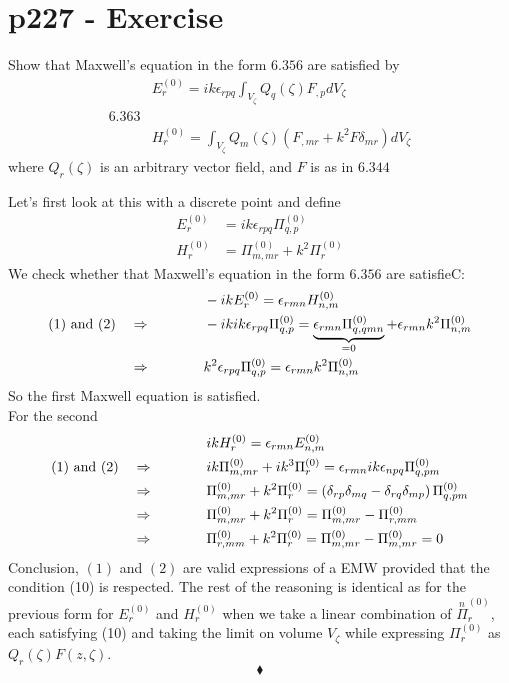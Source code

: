 \section{p227 - Exercise}
\begin{tcolorbox}
Show that Maxwell's equation in the form $\mathbf{6.356}$ are satisfied by 
 $$\begin{array}{ll}& E^{(0)}_r= ik\epsilon_{rpq}\int_{V_{\zeta}}Q_q\left(\zeta\right)F_{,p}dV_{\zeta}\\
 \mathbf{6.363}&\\
 &H^{(0)}_r= \int_{V_{\zeta}}Q_m\left(\zeta\right)\left(F_{,mr}+k^2F\delta_{mr}\right) dV_{\zeta}
 \end{array}$$
 where $Q_r\left(\zeta\right)$ is an arbitrary vector field, and $F$ is as in $\mathbf{6.344}$
\end{tcolorbox}
Let's first look at this with a discrete point and define 
\begin{align}
 E^{(0)}_r&= ik\epsilon_{rpq}\Pi^{(0)}_{q,p}\\
 H^{(0)}_r&= \Pi^{(0)}_{m,mr}+k^2\Pi^{(0)}_r
\end{align}
We check whether that Maxwell's equation in the form $\mathbf{6.356}$ are satisfieC:
\begin{align}
&-ikE^{(0)}_r= \epsilon_{rmn}H^{(0)}_{n,m}\\
\text{(1) and (2)}\quad\Rightarrow \quad\quad\quad\quad &-ikik\epsilon_{rpq}\Pi^{(0)}_{q,p}= \underbrace{\epsilon_{rmn}\Pi^{(0)}_{q,qmn}}_{=0}+\epsilon_{rmn}k^2\Pi^{(0)}_{n,m}\\
\Rightarrow\quad\quad\quad\quad &k^2\epsilon_{rpq}\Pi^{(0)}_{q,p}= \epsilon_{rmn}k^2\Pi^{(0)}_{n,m}
\end{align}
So the first Maxwell equation is satisfied.\\
For the second
\begin{align}
&ikH^{(0)}_r= \epsilon_{rmn}E^{(0)}_{n,m}\\
\text{(1) and (2)}\quad\Rightarrow \quad\quad\quad\quad &ik\Pi^{(0)}_{m,mr}+ik^3\Pi^{(0)}_r= \epsilon_{rmn}ik\epsilon_{npq}\Pi^{(0)}_{q,pm}\\
\Rightarrow\quad\quad\quad\quad &\Pi^{(0)}_{m,mr}+k^2\Pi^{(0)}_r= \left(\delta_{rp}\delta_{mq}-\delta_{rq}\delta_{mp}\right)\Pi^{(0)}_{q,pm}\\
\Rightarrow\quad\quad\quad\quad &\Pi^{(0)}_{m,mr}+k^2\Pi^{(0)}_r= \Pi^{(0)}_{m,mr}-\Pi^{(0)}_{r,mm}\\
\Rightarrow\quad\quad\quad\quad &\Pi^{(0)}_{r,mm}+k^2\Pi^{(0)}_r= \Pi^{(0)}_{m,mr}-\Pi^{(0)}_{m,mr}=0
\end{align}
Conclusion, $(1)$ and $(2)$ are valid expressions of a EMW provided that the condition (10) is respected.
The rest of the reasoning is identical as for  the previous form for $E^{(0)}_r$ and $H^{(0)}_r$ when we take a linear combination of $\overset{n}{\Pi}^{(0)}_r$, each satisfying (10) and taking the limit on volume $V_{\zeta}$ while expressing $\Pi^{(0)}_{r}$ as $Q_{r}\left(\zeta \right)F\left(z,\zeta\right)$.
 $$\blacklozenge$$
\newpage


